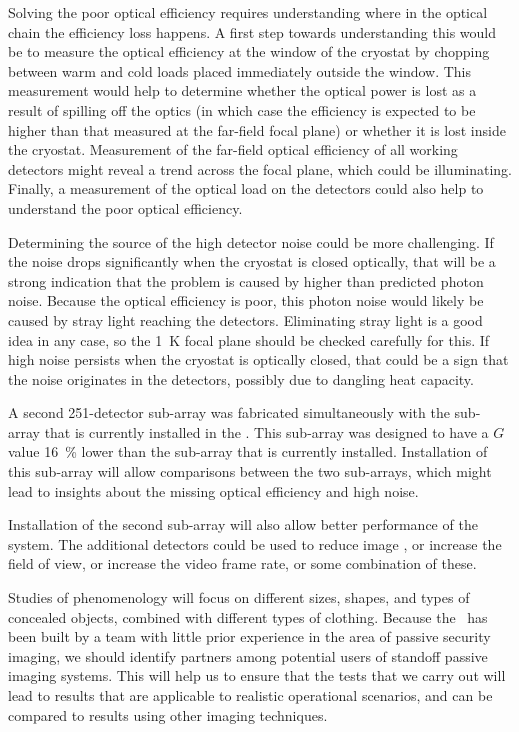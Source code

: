 Solving the poor optical efficiency requires understanding where in the optical chain the efficiency loss happens.
A first step towards understanding this would be to measure the optical efficiency at the window of the cryostat by chopping between warm and cold loads placed immediately outside the window.
This measurement would help to determine whether the optical power is lost as a result of spilling off the optics (in which case the efficiency is expected to be higher than that measured at the far-field focal plane) or whether it is lost inside the cryostat.
Measurement of the far-field optical efficiency of all working detectors might reveal a trend across the focal plane, which could be illuminating.
Finally, a measurement of the optical load on the detectors could also help to understand the poor optical efficiency.

Determining the source of the high detector noise could be more challenging.
If the noise drops significantly when the cryostat is closed optically, that will be a strong indication that the problem is caused by higher than predicted photon noise.
Because the optical efficiency is poor, this photon noise would likely be caused by stray light reaching the detectors.
Eliminating stray light is a good idea in any case, so the \SI{1}{\K} focal plane should be checked carefully for this.
If high noise persists when the cryostat is optically closed, that could be a sign that the noise originates in the detectors, possibly due to dangling heat capacity.

A second 251-detector sub-array was fabricated simultaneously with the sub-array that is currently installed in the \Imager.
This sub-array was designed to have a $G$ value \SI{16}{\percent} lower than the sub-array that is currently installed.
Installation of this sub-array will allow comparisons between the two sub-arrays, which might lead to insights about the missing optical efficiency and high noise.


Installation of the second sub-array will also allow better performance of the system.
The additional detectors could be used to reduce image \NETD, or increase the field of view, or increase the video frame rate, or some combination of these.

Studies of phenomenology will focus on different sizes, shapes, and types of concealed objects, combined with different types of clothing.
Because the \Imager\ has been built by a team with little prior experience in the area of passive security imaging, we should identify partners among potential users of standoff passive imaging systems.
This will help us to ensure that the tests that we carry out will lead to results that are applicable to realistic operational scenarios, and can be compared to results using other imaging techniques.

